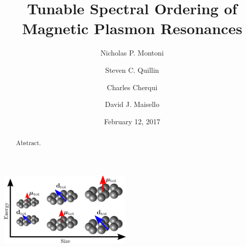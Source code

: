 \documentclass[journal=apchd5,manuscript=article]{achemso}
\author{Nicholas P. Montoni}
\author{Steven C. Quillin}
\author{Charles Cherqui}
\author{David J. Maisello}
\affiliation[Department of Chemistry, University of Washington]
{Department of Chemistry, University of Washington, Seattle, WA 98195}
\date{February 12, 2017}
\title[]
    {Tunable Spectral Ordering of Magnetic Plasmon Resonances}
\begin{document}
\begin{tocentry}
\begin{centering}
\includegraphics[height=3.5cm]{toc.png}
\end{centering}
\end{tocentry}


\begin{abstract}
Abstract.
\end{abstract}
\end{document}
